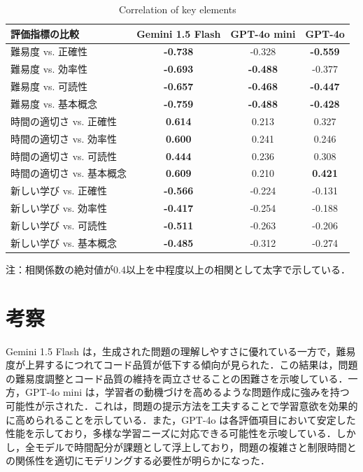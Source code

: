 \documentclass[twocolumn, fleqn, uplatex]{jsarticle}
\begin{document}
\begin{table}[t]
\centering
\scriptsize
\caption{Correlation of key elements}
\label{tab:correlation_results_focused}
\begin{threeparttable}
\begin{tabular}{lccc}
\hline
評価指標の比較 & Gemini 1.5 Flash & GPT-4o mini & GPT-4o \\
\hline
難易度 vs. 正確性 & \textbf{-0.738} & -0.328 & \textbf{-0.559} \\
難易度 vs. 効率性 & \textbf{-0.693} & \textbf{-0.488} & -0.377 \\
難易度 vs. 可読性 & \textbf{-0.657} & \textbf{-0.468} & \textbf{-0.447} \\
難易度 vs. 基本概念 & \textbf{-0.759} & \textbf{-0.488} & \textbf{-0.428} \\
\hline
時間の適切さ vs. 正確性 & \textbf{0.614} & 0.213 & 0.327 \\
時間の適切さ vs. 効率性 & \textbf{0.600} & 0.241 & 0.246 \\
時間の適切さ vs. 可読性 & \textbf{0.444} & 0.236 & 0.308 \\
時間の適切さ vs. 基本概念 & \textbf{0.609} & 0.210 & \textbf{0.421} \\
\hline
新しい学び vs. 正確性 & \textbf{-0.566} & -0.224 & -0.131 \\
新しい学び vs. 効率性 & \textbf{-0.417} & -0.254 & -0.188 \\
新しい学び vs. 可読性 & \textbf{-0.511} & -0.263 & -0.206 \\
新しい学び vs. 基本概念 & \textbf{-0.485} & -0.312 & -0.274 \\
\hline
\end{tabular}
\begin{tablenotes}
\small
\item 注：相関係数の絶対値が0.4以上を中程度以上の相関として太字で示している．
\end{tablenotes}
\end{threeparttable}
\end{table}
\section{考察}
Gemini 1.5 Flash は，生成された問題の理解しやすさに優れている一方で，難易度が上昇するにつれてコード品質が低下する傾向が見られた．この結果は，問題の難易度調整とコード品質の維持を両立させることの困難さを示唆している．一方，GPT-4o mini は，学習者の動機づけを高めるような問題作成に強みを持つ可能性が示された．これは，問題の提示方法を工夫することで学習意欲を効果的に高められることを示している．また，GPT-4o は各評価項目において安定した性能を示しており，多様な学習ニーズに対応できる可能性を示唆している．しかし，全モデルで時間配分が課題として浮上しており，問題の複雑さと制限時間との関係性を適切にモデリングする必要性が明らかになった．
\end{document}
